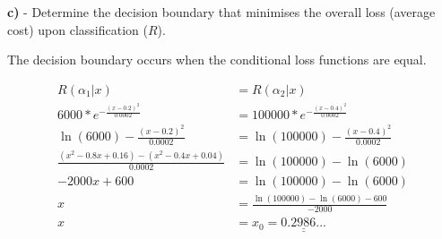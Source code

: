 \documentclass{homeworg}
\begin{document}
\bigskip
\textbf{c)} - Determine the decision boundary that minimises the overall loss (average cost) upon classification ($R$).
\smallskip

The decision boundary occurs when the conditional loss functions are equal.

\begin{equation}
    \begin{aligned}
        R(\alpha_1|x) &= R(\alpha_2|x) \\
        6000*e^{-\frac{(x-0.2)^2}{0.0002}} &= 100000*e^{-\frac{(x-0.4)^2}{0.0002}} \\
        \ln(6000) -\frac{(x-0.2)^2}{0.0002} &= \ln(100000) -\frac{(x-0.4)^2}{0.0002} \\
        \frac{(x^2 - 0.8x + 0.16) - (x^2 - 0.4x + 0.04)}{0.0002} &= \ln(100000) - \ln(6000) \\
        -2000x + 600 &= \ln(100000) - \ln(6000) \\
        x &= \frac{\ln(100000) - \ln(6000) - 600}{-2000} \\
        x &= x_0 = \underline{\underline{0.2986...}}
    \end{aligned}
\end{equation}





\end{document}
